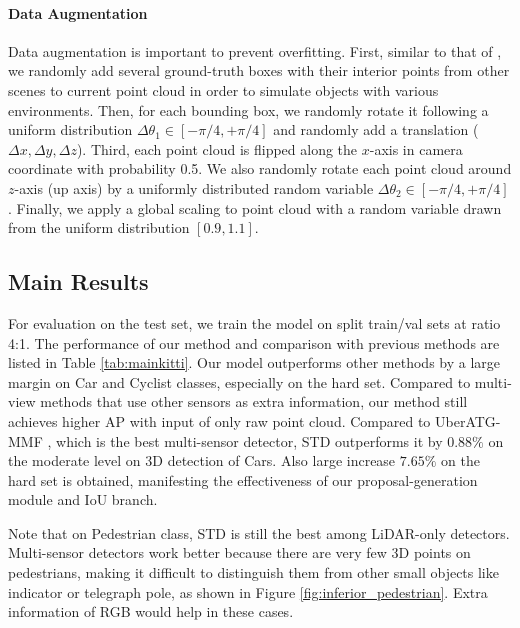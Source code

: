 \documentclass[10pt,twocolumn,letterpaper]{article}
\begin{document}
\vspace{-0.1in}
\paragraph{Data Augmentation}
Data augmentation is important to prevent overfitting. First, similar to that of \cite{yan2018second}, we randomly add several ground-truth boxes with their interior points from other scenes to current point cloud in order to simulate objects with various environments. Then, for each bounding box, we randomly rotate it following a uniform distribution $\Delta \theta_1 \in [- \pi / 4, + \pi / 4]$ and randomly add a translation ($\Delta x, \Delta y, \Delta z$). Third, each point cloud is flipped along the $x$-axis in camera coordinate with probability 0.5. We also randomly rotate each point cloud around $z$-axis (up axis) by a uniformly distributed random variable $\Delta \theta_2 \in [- \pi / 4, + \pi / 4]$. Finally, we apply a global scaling to point cloud with a random variable drawn from the uniform distribution $[0.9, 1.1]$.



\subsection{Main Results}

For evaluation on the test set, we train the model on split train/val sets at ratio 4:1.
The performance of our method and comparison with previous methods are listed in Table \ref{tab:mainkitti}. Our model outperforms other methods by a large margin on Car and Cyclist classes, especially on the hard set. Compared to multi-view methods that use other sensors as extra information, our method still achieves higher AP with input of only raw point cloud. Compared to UberATG-MMF \cite{Liang2019CVPR}, which is the best multi-sensor detector, STD outperforms it by $0.88 \%$ on the moderate level on 3D detection of Cars. Also large increase $7.65 \%$ on the hard set is obtained, manifesting the effectiveness of our proposal-generation module and IoU branch.

Note that on Pedestrian class, STD is still the best among LiDAR-only detectors. Multi-sensor detectors work better because there are very few 3D points on pedestrians, making it difficult to distinguish them from other small objects like indicator or telegraph pole, as shown in Figure \ref{fig:inferior_pedestrian}. Extra information of RGB would help in these cases.
\end{document}
